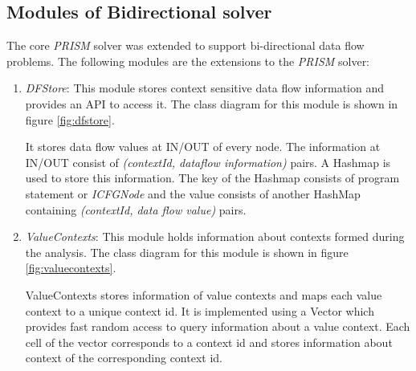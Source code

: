 \documentclass[11pt,a4paper,openright]{report}
\begin{document}
\subsection*{Modules of Bidirectional solver}
The  core \emph{PRISM} solver was extended to support bi-directional data flow problems. 
The following modules are the extensions to the \emph{PRISM} solver:

\begin{enumerate}
\item \emph{DFStore}: This module stores context sensitive data flow information and provides an API to access it. The class diagram for this module 
is shown in figure \ref{fig:dfstore}.

It stores data flow values at IN/OUT of every node. The information at IN/OUT consist of \emph{(contextId, dataflow information)} pairs. 
A Hashmap is used to store this information. The key of the Hashmap consists of program statement or \emph{ICFGNode} and the value consists
of another HashMap containing \emph{(contextId, data flow value)} pairs.

% 





\item \emph{ValueContexts}: This module holds information about contexts formed during the analysis.
The class diagram for this module is shown in figure \ref{fig:valuecontexts}.

ValueContexts stores information of value contexts and maps each value context to a unique context id. 
It is implemented using a Vector which provides fast random access to query information about a value context. Each cell of the vector corresponds to
a context id and stores information about context of the corresponding context id. 


\end{enumerate}
\end{document}
